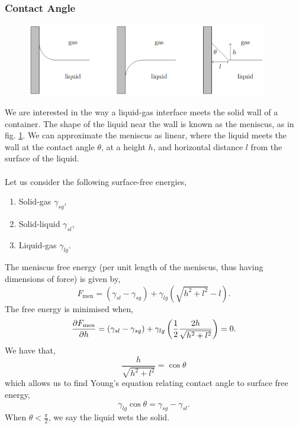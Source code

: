 \documentclass{book}
\begin{document}
\subsubsection{Contact Angle}
\begin{figure}
	\centering
	\includegraphics[width=400px]{contactangle.png}
	\caption{}\label{fig:contactangle}
\end{figure}
We are interested in the way a liquid-gas interface meets the solid wall of a container. The shape of the liquid near the wall is known as the meniscus, as in fig. \ref{fig:contactangle}. We can approximate the meniscus as linear, where the liquid meets the wall at the contact angle $\theta$, at a height $h$, and horizontal distance $l$ from the surface of the liquid.
\\\\
Let us consider the following surface-free energies,
\begin{enumerate}
	\item Solid-gas $\gamma_{sg}$,
	\item Solid-liquid $\gamma_{sl}$,
	\item Liquid-gas $\gamma_{lg}$.
\end{enumerate}
The meniscus free energy (per unit length of the meniscus, thus having dimensions of force) is given by,
\begin{equation}
	F_{\text{men}} = \left(\gamma_{sl} - \gamma_{sg}\right) + \gamma_{lg}\left(\sqrt{h^2 + l^2} - l\right).
\end{equation}
The free energy is minimised when,
\begin{equation}
	\pdv{F_{\text{men}}}{h} = \left(\gamma_{sl} - \gamma_{sg}\right) + \gamma_{lg}\left(\frac{1}{2}\frac{2h}{\sqrt{h^2 + l^2}}\right) = 0.
\end{equation}
We have that, 
\begin{equation}
	\frac{h}{\sqrt{h^2 + l^2}} = \cos\theta 
\end{equation}
which allows us to find Young's equation relating contact angle to surface free energy,
\begin{equation}
	\boxed{\gamma_{lg}\cos\theta = \gamma_{sg}-\gamma_{sl}}.
\end{equation}
When $\theta < \frac{\pi}{2}$, we say the liquid wets the solid.
\end{document}
